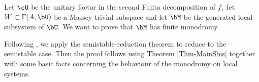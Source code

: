 \documentclass[a4paper,11pt]{amsart}
\newtheorem{proposition}[theorem]{Proposition}
\begin{document}
{%
%                   			
%                   			
                   				Let $\cU$ be the unitary factor in the second Fujita decomposition of $f,$ let $W\subset \Gamma(A, \bU)$ be a Massey-trivial subspace and let $\bM$ be the generated local subsystem of $\bU.$ We want to prove that $\bM$ has finite monodromy.
                   				
                   			 Following \cite{CD:Answer_2017}, we apply the semistable-reduction theorem to reduce to the semistable case.  
                   			Then the proof follows using Theorem \ref{Thm-MainSbis} together with some basic facts concerning the behaviour of the monodromy on local systems. 
                   			
}
\end{document}
